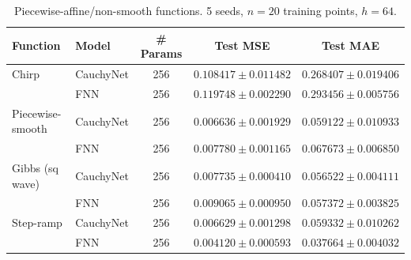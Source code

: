 \begin{table}[ht]\centering
\caption{Piecewise-affine/non-smooth functions. 5 seeds, $n=20$ training points, $h=64$.}
\label{tab:piecewise}
\begin{tabular}{llccc}
\toprule
Function & Model & \# Params & Test MSE & Test MAE \\
\midrule
Chirp & CauchyNet & 256 & $0.108417 \pm 0.011482$ & $0.268407 \pm 0.019406$ \\
 & FNN & 256 & $0.119748 \pm 0.002290$ & $0.293456 \pm 0.005756$ \\
\midrule
Piecewise-smooth & CauchyNet & 256 & $0.006636 \pm 0.001929$ & $0.059122 \pm 0.010933$ \\
 & FNN & 256 & $0.007780 \pm 0.001165$ & $0.067673 \pm 0.006850$ \\
\midrule
Gibbs (sq wave) & CauchyNet & 256 & $0.007735 \pm 0.000410$ & $0.056522 \pm 0.004111$ \\
 & FNN & 256 & $0.009065 \pm 0.000950$ & $0.057372 \pm 0.003825$ \\
\midrule
Step-ramp & CauchyNet & 256 & $0.006629 \pm 0.001298$ & $0.059332 \pm 0.010262$ \\
 & FNN & 256 & $0.004120 \pm 0.000593$ & $0.037664 \pm 0.004032$ 
\bottomrule
\end{tabular}
\end{table}